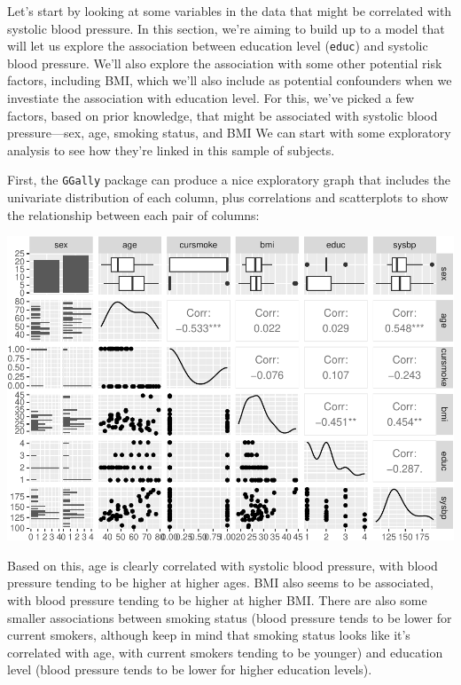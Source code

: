 \documentclass[
]{book}
\newenvironment{Shaded}{\begin{snugshade}}{\end{snugshade}}
\newcommand{\KeywordTok}[1]{\textcolor[rgb]{0.13,0.29,0.53}{\textbf{#1}}}
\newcommand{\NormalTok}[1]{#1}
\newcommand{\OperatorTok}[1]{\textcolor[rgb]{0.81,0.36,0.00}{\textbf{#1}}}
\newcommand{\StringTok}[1]{\textcolor[rgb]{0.31,0.60,0.02}{#1}}
\begin{document}
Let's start by looking at some variables in the data that might be correlated
with systolic blood pressure. In this section, we're aiming to build up to a
model that will let us explore the association between education level (\texttt{educ})
and systolic blood pressure. We'll also explore the association with some other
potential risk factors, including BMI, which we'll also include as potential
confounders when we investiate the association with education level. For this,
we've picked a few factors, based on prior knowledge, that might be associated
with systolic blood pressure---sex, age, smoking status, and BMI We can start
with some exploratory analysis to see how they're linked in this sample of
subjects.

First, the \texttt{GGally} package can produce a nice exploratory graph that includes
the univariate distribution of each column, plus correlations and scatterplots
to show the relationship between each pair of columns:

\begin{Shaded}
\end{Shaded}

\includegraphics{adv_epi_analysis_files/figure-latex/unnamed-chunk-285-1.pdf}

Based on this, age is clearly correlated with systolic blood pressure, with
blood pressure tending to be higher at higher ages. BMI also seems to be
associated, with blood pressure tending to be higher at higher BMI. There are
also some smaller associations between smoking status (blood pressure tends to
be lower for current smokers, although keep in mind that smoking status looks
like it's correlated with age, with current smokers tending to be younger) and
education level (blood pressure tends to be lower for higher education levels).
\end{document}
